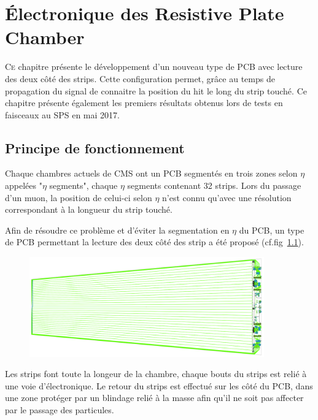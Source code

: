 \chapter{Électronique des Resistive Plate Chamber}
\renewcommand\chapterillustration{ELE/ele}
\ThisULCornerWallPaper{1}{\chapterillustration}
\minitoc

\lettrine[lines=4, slope=-0.5em]{C}{e} chapitre présente le développement d'un nouveau type de PCB avec lecture des deux côté des strips. Cette configuration permet, grâce au temps de propagation du signal de connaitre la position du hit le long du strip touché. Ce chapitre présente également les premiers résultats obtenus lors de tests en faisceaux au SPS en mai 2017.

\section{Principe de fonctionnement}

Chaque chambres actuels de CMS ont un PCB segmentés en trois zones selon $\eta$ appelées "$\eta$ segments", chaque $\eta$ segments contenant \num{32} strips. Lors du passage d'un muon, la position de celui-ci selon $\eta$ n'est connu qu'avec une résolution correspondant à la longueur du strip touché.

Afin de résoudre ce problème et d'éviter la segmentation en $\eta$ du PCB, un type de PCB permettant la lecture des deux côté des strip a été proposé (cf.fig~\ref{PCB1}).

\begin{figure}[ht!]
	\centering
	\includegraphics[width=0.90\textwidth]{ELE/PCB1.png}
	\label{PCB1}
\end{figure}

Les strips font toute la longeur de la chambre, chaque bouts du strips est relié à une voie d'électronique. Le retour du strips est effectué sur les côté du PCB, dans une zone protéger par un blindage relié à la masse afin qu'il ne soit pas affecter par le passage des particules.

